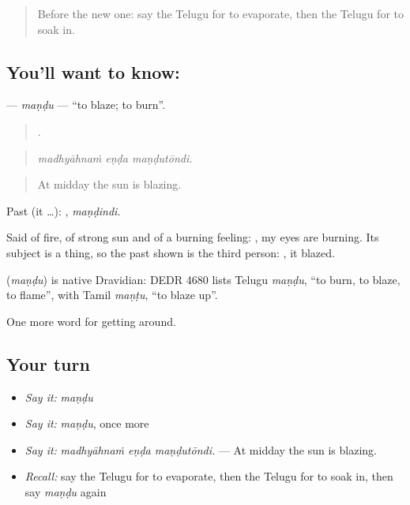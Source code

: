 \label{lesson:TE-C483-mandu}



\begin{quote}
Before the new one: say the Telugu for to evaporate, then the Telugu for to soak in.
\end{quote}

\subsection*{You'll want to know: }
\textbf{} — \emph{maṇḍu} — \textquotedblleft{}to blaze; to burn\textquotedblright{}.

\begin{quote}
  .
\end{quote}

\begin{quote}
\emph{madhyāhnaṁ eṇḍa maṇḍutōndi.}
\end{quote}

\begin{quote}
At midday the sun is blazing.
\end{quote}

Past (it …): , \emph{maṇḍindi}.

Said of fire, of strong sun and of a burning feeling:  , my eyes are burning. Its subject is a thing, so the past shown is the third person: , it blazed.

\begin{cousinweb}
\textbf{} (\emph{maṇḍu}) is native Dravidian: DEDR 4680 lists Telugu \emph{maṇḍu}, \textquotedblleft{}to burn, to blaze, to flame\textquotedblright{}, with Tamil \emph{maṇṭu}, \textquotedblleft{}to blaze up\textquotedblright{}.
\end{cousinweb}

\begin{grammarlens}[title={What you've built}]
One more word for getting around.
\end{grammarlens}

\subsection*{Your turn}
\begin{itemize}
\raggedright
  \item \emph{Say it:} \emph{maṇḍu}
  \item \emph{Say it:} \emph{maṇḍu}, once more
  \item \emph{Say it:} \emph{madhyāhnaṁ eṇḍa maṇḍutōndi.} — At midday the sun is blazing.
  \item \emph{Recall:} say the Telugu for to evaporate, then the Telugu for to soak in, then say \emph{maṇḍu} again
\end{itemize}

